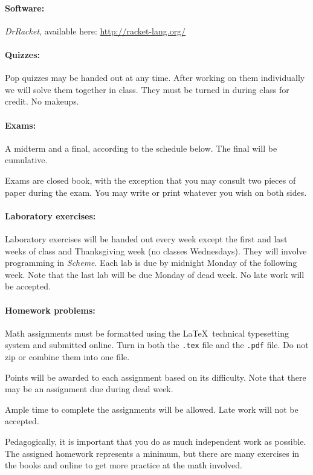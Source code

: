 \documentclass{article}
\begin{document}
\paragraph{Software:} {\em DrRacket}, available here: 
\url{http://racket-lang.org/}

\paragraph{Quizzes:}  
Pop quizzes may be handed out at any time.  After working
on them individually we will solve them together in class.
They must be turned in during class for credit.  No makeups.

\paragraph{Exams:} A midterm and a final, according to the schedule below.
The final will be cumulative.

Exams are closed book, with the exception that you may
consult two pieces of paper during the exam.  You may write or print
whatever you wish on both sides.

\paragraph{Laboratory exercises:}
Laboratory exercises will be handed out every week except the first
and last weeks of class and Thanksgiving week (no classes Wednesdays).
They will involve programming in {\em Scheme}.  Each lab is due by
midnight Monday of the following week.  Note that the last lab will be
due Monday of dead week.  No late work will be accepted.

\paragraph{Homework problems:}
Math assignments must be formatted using the \LaTeX\ technical
typesetting system and submitted online.  Turn in both the {\tt .tex}
file and the {\tt .pdf} file.  Do not zip or combine them into one
file.

Points will be awarded to each assignment based on its difficulty.
Note that there may be an assignment due during dead week.

Ample time to complete the assignments will be allowed.  Late work
will not be accepted.

Pedagogically, it is important that you do as much independent work as
possible.  The assigned homework represents a minimum, but there are
many exercises in the books and online to get more practice at the
math involved.
\end{document}
